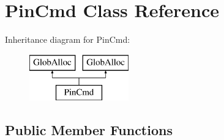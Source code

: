 \hypertarget{classPinCmd}{\section{Pin\-Cmd Class Reference}
\label{classPinCmd}
}
Inheritance diagram for Pin\-Cmd\-:\begin{figure}[H]
\begin{center}
\leavevmode
\includegraphics[height=2.000000cm]{classPinCmd}
\end{center}
\end{figure}
\subsection*{Public Member Functions}
